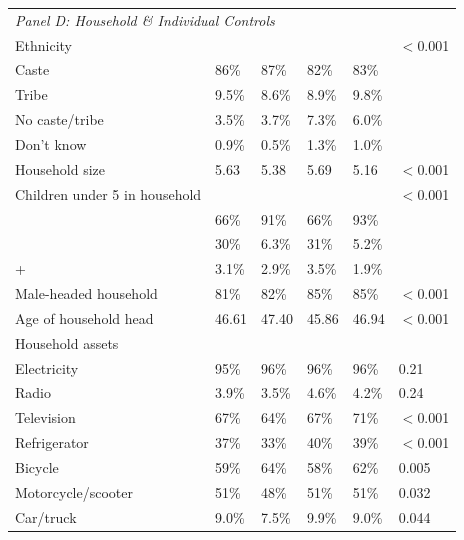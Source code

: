 \documentclass{article}
\begin{document}
\begin{landscape}
\begin{longtable}{@{}p{6cm}p{2.5cm}p{2.5cm}p{2.5cm}p{2.5cm}p{1.5cm}@{}}
\multicolumn{6}{l}{\textit{Panel D: Household \& Individual Controls}} \\[2pt]

\quad Ethnicity                              &        &        &        &        & $<$0.001 \\
\quad\quad Caste                             & 86\%   & 87\%   & 82\%   & 83\%   &          \\
\quad\quad Tribe                             & 9.5\%  & 8.6\%  & 8.9\%  & 9.8\%  &          \\
\quad\quad No caste/tribe                    & 3.5\%  & 3.7\%  & 7.3\%  & 6.0\%  &          \\
\quad\quad Don't know                        & 0.9\%  & 0.5\%  & 1.3\%  & 1.0\%  &          \\[4pt]

\quad Household size                         & 5.63   & 5.38   & 5.69   & 5.16   & $<$0.001 \\
\quad Children under 5 in household         &        &        &        &        & $<$0.001 \\
\quad\quad 0                                 & 66\%   & 91\%   & 66\%   & 93\%   &          \\
\quad\quad 1                                 & 30\%   & 6.3\%  & 31\%   & 5.2\%  &          \\
\quad\quad 2+                                & 3.1\%  & 2.9\%  & 3.5\%  & 1.9\%  &          \\[4pt]

\quad Male-headed household                  & 81\%   & 82\%   & 85\%   & 85\%   & $<$0.001 \\
\quad Age of household head                  & 46.61  & 47.40  & 45.86  & 46.94  & $<$0.001 \\[4pt]

\quad Household assets                       &        &        &        &        &          \\
\quad\quad Electricity                       & 95\%   & 96\%   & 96\%   & 96\%   & 0.21     \\
\quad\quad Radio                             & 3.9\%  & 3.5\%  & 4.6\%  & 4.2\%  & 0.24     \\
\quad\quad Television                        & 67\%   & 64\%   & 67\%   & 71\%   & $<$0.001 \\
\quad\quad Refrigerator                      & 37\%   & 33\%   & 40\%   & 39\%   & $<$0.001 \\
\quad\quad Bicycle                           & 59\%   & 64\%   & 58\%   & 62\%   & 0.005    \\
\quad\quad Motorcycle/scooter                & 51\%   & 48\%   & 51\%   & 51\%   & 0.032    \\
\quad\quad Car/truck                         & 9.0\%  & 7.5\%  & 9.9\%  & 9.0\%  & 0.044    \\[4pt]


\end{longtable}
\end{landscape}
\end{document}
